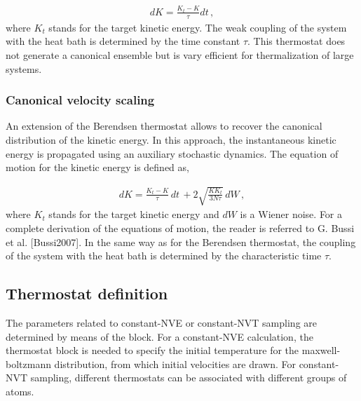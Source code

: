 \documentclass[letterpaper,10pt,english]{sphinxmanual}
\begin{document}
\label{\detokenize{BOMD:equation-berendsen1}}\begin{equation}\label{equation:BOMD:berendsen1}
\begin{split}dK = \frac{K_{t}-K}{\tau} dt\, ,\end{split}
\end{equation}
where \(K_{t}\) stands for the target kinetic energy. The weak
coupling of the system with the heat bath is determined by the time
constant \(\tau\). This thermostat does not generate a canonical
ensemble but is vary efficient for thermalization of large systems.


\subsubsection{Canonical velocity scaling}
\label{\detokenize{BOMD:canonical-velocity-scaling}}
An extension of the Berendsen thermostat allows to recover the canonical
distribution of the kinetic energy. In this approach, the instantaneous
kinetic energy is propagated using an auxiliary stochastic dynamics. The
equation of motion for the kinetic energy is defined as,

\label{\detokenize{BOMD:equation-bussi1}}\begin{equation}\label{equation:BOMD:bussi1}
\begin{split}dK = \frac{K_{t}-K}{\tau}\, dt\, +2 \sqrt{\frac{KK_t}{3N \tau}}\, dW\, ,\end{split}
\end{equation}
where \(K_{t}\) stands for the target kinetic energy and
\(dW\) is a Wiener noise. For a complete derivation of the equations
of motion, the reader is referred to G. Bussi et
al. {[}Bussi2007{]}. In the same way as for the Berendsen
thermostat, the coupling of the system with the heat bath is determined
by the characteristic time \(\tau\).


\subsection{Thermostat definition}
\label{\detokenize{BOMD:thermostat-definition}}
The parameters related to constant-NVE or
constant-NVT sampling are determined by means of the 
block. For a constant-NVE calculation, the thermostat block is needed to
specify the initial temperature for the maxwell-boltzmann distribution,
from which initial velocities are drawn. For constant-NVT sampling,
different thermostats can be associated with different groups of atoms.
\end{document}
